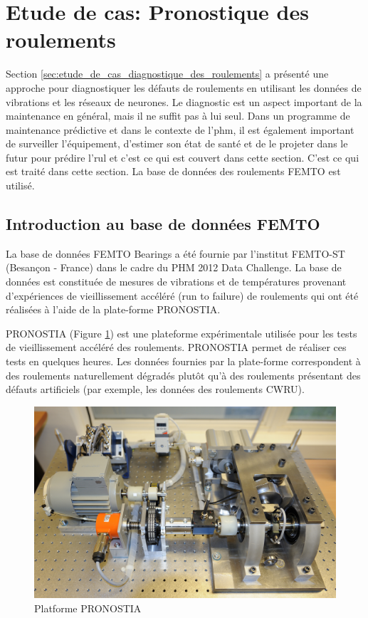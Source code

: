 \section{Etude de cas: Pronostique des roulements}%
\label{sec:etude_de_cas_pronostique_des_roulements}
Section \ref{sec:etude_de_cas_diagnostique_des_roulements} a présenté une approche pour diagnostiquer les défauts de roulements en utilisant les données de vibrations et les réseaux de neurones. Le diagnostic est un aspect important de la maintenance en général, mais il ne suffit pas à lui seul. Dans un programme de maintenance prédictive et dans le contexte de l'\acrshort{phm}, il est également important de surveiller l'équipement, d'estimer son état de santé et de le projeter dans le futur pour prédire l'\acrshort{rul} et c'est ce qui est couvert dans cette section. C'est ce qui est traité dans cette section. La base de données des roulements FEMTO est utilisé.


\subsection{Introduction au base de données FEMTO}%
\label{sub:introduction_au_base_de_donnees_femto}

La base de données FEMTO Bearings a été fournie par l'institut FEMTO-ST (Besançon - France) dans le cadre du PHM 2012 Data Challenge. La base de données est constituée de mesures de vibrations et de températures provenant d'expériences de vieillissement accéléré (run to failure) de roulements qui ont été réalisées à l'aide de la plate-forme PRONOSTIA.

PRONOSTIA (Figure \ref{fig:pronostia-platform}) est une plateforme expérimentale utilisée pour les tests de vieillissement accéléré des roulements. PRONOSTIA permet de réaliser ces tests en quelques heures. Les données fournies par la plate-forme correspondent à des roulements naturellement dégradés plutôt qu'à des roulements présentant des défauts artificiels (par exemple, les données des roulements CWRU).

\begin{figure}[h]
	\centering
	\includegraphics[width=.8\linewidth]{figures/pronostia.jpg}
	\caption{Platforme PRONOSTIA \cite{pronostia}}%
	\label{fig:pronostia-platform}
\end{figure}

